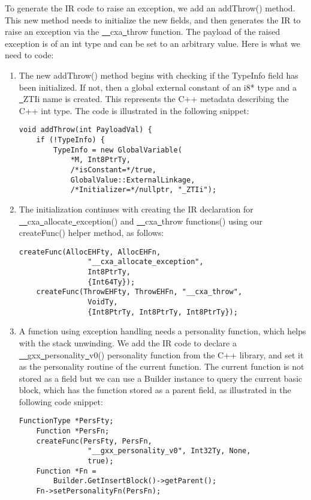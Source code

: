 To generate the IR code to raise an exception, we add an addThrow() method. This new method needs to initialize the new fields, and then generates the IR to raise an exception via the \underline{~~}cxa\underline{~}throw function. The payload of the raised exception is of an int type and can be set to an arbitrary value. Here is what we need to code:\par

\begin{enumerate}
\item The new addThrow() method begins with checking if the TypeInfo field has been initialized. If not, then a global external constant of an i8* type and a \underline{~}ZTIi name is created. This represents the C++ metadata describing the C++ int type. The code is illustrated in the following snippet:
\begin{lstlisting}[caption={}]
void addThrow(int PayloadVal) {
	if (!TypeInfo) {
		TypeInfo = new GlobalVariable(
			*M, Int8PtrTy,
			/*isConstant=*/true,
			GlobalValue::ExternalLinkage,
			/*Initializer=*/nullptr, "_ZTIi");
\end{lstlisting}

\item The initialization continues with creating the IR declaration for \underline{~~}cxa\underline{~}allocate\underline{~}exception() and \underline{~~}cxa\underline{~}throw functions() using our createFunc() helper method, as follows:
\begin{lstlisting}[caption={}]
	createFunc(AllocEHFty, AllocEHFn,
				"__cxa_allocate_exception", 
				Int8PtrTy,
				{Int64Ty});
	createFunc(ThrowEHFty, ThrowEHFn, "__cxa_throw",
				VoidTy,
				{Int8PtrTy, Int8PtrTy, Int8PtrTy});
\end{lstlisting}

\item A function using exception handling needs a personality function, which helps with the stack unwinding. We add the IR code to declare a \underline{~~}gxx\underline{~}personality\underline{~}v0() personality function from the C++ library, and set it as the personality routine of the current function. The current function is not stored as a field but we can use a Builder instance to query the current basic block, which has the function stored as a parent field, as illustrated in the following code snippet:
\begin{lstlisting}[caption={}]
	FunctionType *PersFty;
	Function *PersFn;
	createFunc(PersFty, PersFn,
				"__gxx_personality_v0", Int32Ty, None,
				true);
	Function *Fn =
		Builder.GetInsertBlock()->getParent();
	Fn->setPersonalityFn(PersFn);
\end{lstlisting}


\end{enumerate}
